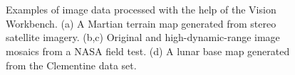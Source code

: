 \begin{figure}[p]
\centering
  \\
  \hfil
  \\
\caption{Examples of image data processed with the help of the Vision Workbench.  (a) A Martian terrain map generated from 
stereo satellite imagery.  (b,c) Original and high-dynamic-range image mosaics from a NASA field test.  (d) A lunar 
base map generated from the Clementine data set. }
\label{fig:examples}
\end{figure}


